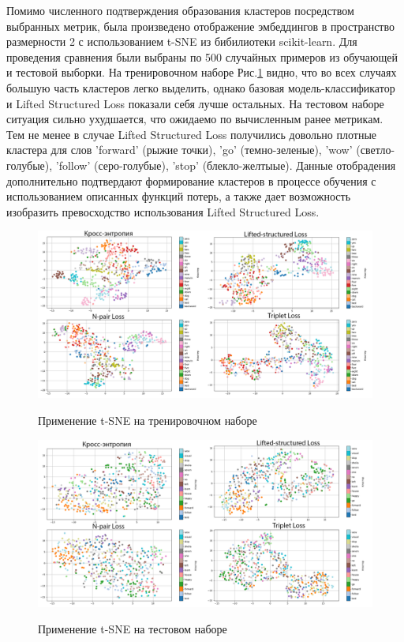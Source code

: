 \par
Помимо численного подтверждения образования кластеров посредством выбранных метрик, была произведено отображение эмбеддингов в пространство размерности 2 с использованием t-SNE из бибилиотеки scikit-learn. Для проведения сравнения были выбраны по 500 случайных примеров из обучающей и тестовой выборки. На тренировочном наборе Рис.\ref{fig:tsne_train_4} видно, что во всех случаях большую часть кластеров легко выделить, однако базовая модель-классификатор и Lifted Structured Loss показали себя лучше остальных. На тестовом наборе ситуация сильно ухудшается, что ожидаемо по вычисленным ранее метрикам. Тем не менее в случае Lifted Structured Loss получились довольно плотные кластера для слов 'forward' (рыжие точки), 'go' (темно-зеленые), 'wow' (светло-голубые), 'follow' (серо-голубые), 'stop' (блекло-желтыые). Данные отобрадения дополнительно подтвердают формирование кластеров в процессе обучения с использованием описанных функций потерь, а также дает возможность изобразить превосходство использования Lifted Structured Loss.

\newpage


\begin{figure}[!h]
\caption{Применение t-SNE на тренировочном наборе}
\centering
\includegraphics[width=16cm]{Images/tsne_train_4.png}
\label{fig:tsne_train_4}
\end{figure}

\begin{figure}[!h]
\caption{Применение t-SNE на тестовом наборе}
\centering
\includegraphics[width=16cm]{Images/test_tsne_4.png}
\label{fig:tsne_test_4}
\end{figure}